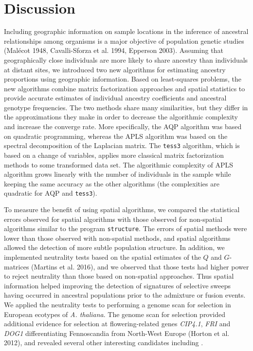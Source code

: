 \clearpage
\newpage



\section{Discussion}

Including geographic information on sample locations in the inference of ancestral relationships among  organisms is a major objective of population genetic studies (Mal\'ecot 1948, Cavalli-Sforza et al. 1994, Epperson 2003). Assuming that geographically close individuals are more likely to share ancestry than individuals at distant sites, we introduced two new  algorithms for estimating ancestry proportions using geographic information. Based on least-squares problems, the new algorithms combine matrix factorization approaches and spatial statistics to provide accurate estimates of individual ancestry coefficients and ancestral genotype frequencies. The two methods share many similarities, but they differ in the approximations they make in order to decrease the algorithmic complexity and  increase the converge rate.  More specifically, the AQP algorithm was based on quadratic programming, whereas the APLS algorithm was based on the spectral decomposition of the Laplacian matrix. The {\tt tess3} algorithm, which is based on a change of variables, applies more classical matrix factorization methods to some transformed data set. The algorithmic complexity of APLS algorithm grows linearly with the number of individuals in the sample while keeping the same accuracy as the other algorithms (the complexities are quadratic for AQP and {\tt tess3}). 


To measure the benefit of using spatial algorithms, we compared the statistical errors observed for spatial algorithms with those observed for non-spatial algorithms similar to the program {\tt structure}. The errors of spatial methods were lower than those observed  with non-spatial methods, and spatial algorithms allowed the detection of more subtle population structure. In addition, we implemented neutrality tests based on the spatial estimates of the $Q$ and $G$-matrices (Martins et al. 2016), and we observed that those tests had higher power to reject neutrality than those based on non-spatial approaches. Thus spatial information helped improving the detection of signatures of selective sweeps having occurred  in ancestral populations prior to the admixture or fusion events. We applied the neutrality tests to performing a genome scan for selection in European ecotypes of {\it A. thaliana}. The genome scan for selection provided additional evidence for selection at flowering-related genes {\it CIP4.1}, {\it FRI} and {\it DOG1} differentiating Fennoscandia from North-West Europe (Horton et al. 2012), and revealed several other interesting candidates including .
 

